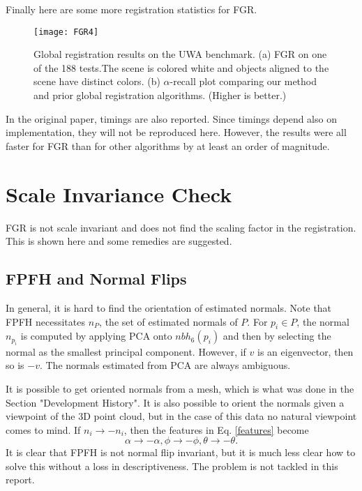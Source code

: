 \documentclass[10pt,a4paper]{article}
\begin{document}
Finally here are some more registration statistics for FGR. 

\begin{figure}[H]
	\centering
	\centerline{
	\texttt{[image: FGR4]}}
	\caption{Global registration results on the UWA benchmark. (a) FGR on one of the 188 tests.The scene is colored white and objects aligned to the scene have distinct colors. (b) $\alpha$-recall plot comparing our method and prior global registration algorithms. (Higher is better.)}
	\label{fig:fgr4}
\end{figure}

In the original paper, timings are also reported. Since timings depend also on implementation, they will not be reproduced here. However, the results were all faster for FGR than for other algorithms by at least an order of magnitude. 


\section{Scale Invariance Check}\label{sec3}

FGR is not scale invariant and does not find the scaling factor in the registration. This is shown here and some remedies are suggested. 

\subsection{FPFH and Normal Flips}

In general, it is hard to find the orientation of estimated normals. Note that FPFH necessitates $n_P$, the set of estimated normals of $P$. For $p_i \in P$, the normal $n_{p_i}$ is computed by applying PCA onto $nbh_6(p_i)$ and then by selecting the normal as the smallest principal component. However, if $v$ is an eigenvector, then so is $-v$. The normals estimated from PCA are always ambiguous. 

It is possible to get oriented normals from a mesh, which is what was done in the Section "Development History". It is also possible to orient the normals given a viewpoint of the 3D point cloud, but in the case of this data no natural viewpoint comes to mind. If $n_i \to -n_i$, then the features in Eq. \ref{features} become 
\[\alpha \to -\alpha, \phi \to -\phi, \theta \to -\theta.\]
It is clear that FPFH is not normal flip invariant, but it is much less clear how to solve this without a loss in descriptiveness. The problem is not tackled in this report. 
\end{document}
